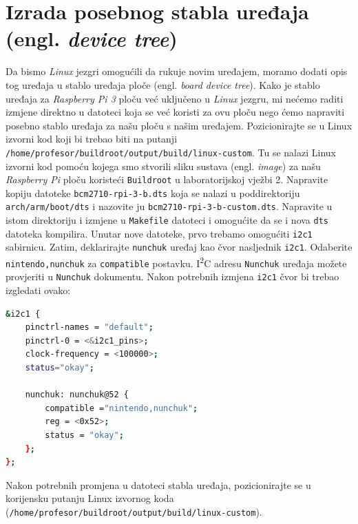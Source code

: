 \documentclass[11pt]{article}
\begin{document}
\section{Izrada posebnog stabla uređaja (engl. \textit{device tree})}
Da bismo \textit{Linux} jezgri omogućili da rukuje novim uređajem, moramo dodati
opis tog uređaja u stablo uređaja ploče (engl. \textit{board device tree}).
Kako je stablo uređaja za \textit{Raspberry Pi 3} ploču već uključeno u
\textit{Linux} jezgru, mi nećemo raditi izmjene direktno u datoteci koja se već
koristi za ovu ploču nego ćemo napraviti posebno stablo uređaja za našu ploču
s našim uređajem.
\newline
\newline
Pozicionirajte se u Linux izvorni kod koji bi trebao biti na putanji\\
\texttt{/home/profesor/buildroot/output/build/linux-custom}. Tu se nalazi Linux
izvorni kod pomoću kojega smo stvorili sliku sustava (engl. \textit{image})
za našu \textit{Raspberry Pi} ploču koristeći \texttt{Buildroot} u laboratorijskoj
vježbi 2. Napravite kopiju datoteke \texttt{bcm2710-rpi-3-b.dts} koja se nalazi
u poddirektoriju \texttt{arch/arm/boot/dts} i nazovite ju \texttt{bcm2710-rpi-3-b-custom.dts}.
Napravite u istom direktoriju i izmjene u \texttt{Makefile} datoteci i
omogućite da se i nova \texttt{dts} datoteka kompilira.
\newline
\newline
Unutar nove datoteke, prvo trebamo omogućiti \texttt{i2c1} sabirnicu.
Zatim, deklarirajte \texttt{nunchuk} uređaj kao čvor nasljednik \texttt{i2c1}.
Odaberite \texttt{nintendo,nunchuk} za \texttt{compatible} postavku.
I\textsuperscript{2}C adresu \texttt{Nunchuk} uređaja možete provjeriti u
\texttt{Nunchuk} dokumentu.
\newline
\newline
Nakon potrebnih izmjena \texttt{i2c1} čvor bi trebao izgledati ovako:
\begin{lstlisting}[language=bash]
&i2c1 {
	pinctrl-names = "default";
	pinctrl-0 = <&i2c1_pins>;
	clock-frequency = <100000>;
	status="okay";

	nunchuk: nunchuk@52 {
		compatible ="nintendo,nunchuk";
		reg = <0x52>;
		status = "okay";
	};
};
\end{lstlisting}
Nakon potrebnih promjena u datoteci stabla uređaja, pozicionirajte se u
korijensku putanju Linux izvornog koda\\
(\texttt{/home/profesor/buildroot/output/build/linux-custom}).\\
\end{document}

